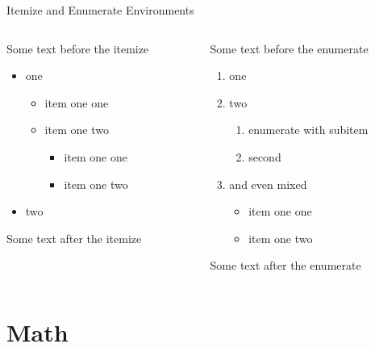 \begin{frame}{Itemize and Enumerate Environments}
	\begin{columns}
		\begin{column}{0.5\textwidth}
			Some text before the itemize
			\begin{itemize}
				\item one \begin{itemize}
					\item item one one
					\item item one two \begin{itemize}
						\item item one one
						\item item one two
					\end{itemize}
				\end{itemize}
				\item two
			\end{itemize}
		Some text after the itemize
		\end{column}
		\begin{column}{0.5\textwidth}
			Some text before the enumerate
			\begin{enumerate}
				\item one
				\item two \begin{enumerate}
					\item enumerate with subitem
					\item second
				\end{enumerate}
			\item and even mixed  \begin{itemize}
					\item item one one
					\item item one two
				\end{itemize}
			\end{enumerate}
		Some text after the enumerate
		\end{column}
	\end{columns}
\end{frame}

\section{Math}
\rptusectionpage

